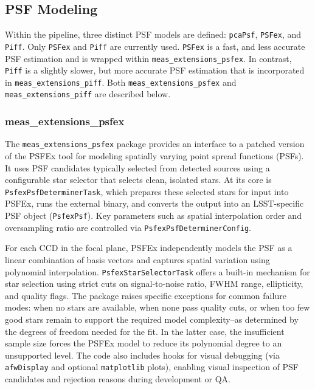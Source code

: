 \subsection{PSF Modeling}

Within the pipeline, three distinct PSF models are defined:  \texttt{pcaPsf}, \texttt{PSFex}, and \texttt{Piff}.
Only \texttt{PSFex} and \texttt{Piff} are currently used.
\texttt{PSFex} is a fast, and less accurate PSF estimation and is wrapped within \texttt{meas\_extensions\_psfex}.
In contrast, \texttt{Piff} is a slightly slower, but more accurate PSF estimation that is incorporated in \texttt{meas\_extensions\_piff}. Both \texttt{meas\_extensions\_psfex} and \texttt{meas\_extensions\_piff} are described below.

\subsubsection{meas\_extensions\_psfex}\label{sec:meas_extensions_psfex}

The \texttt{meas\_extensions\_psfex} package provides an interface to a patched version of the PSFEx tool \citep{2011ASPC..442..435B} for modeling spatially varying point spread functions (PSFs).
It uses PSF candidates typically selected from detected sources using a configurable star selector that selects clean, isolated stars.
At its core is \texttt{PsfexPsfDeterminerTask}, which prepares these selected stars for input into PSFEx, runs the external binary, and converts the output into an LSST-specific PSF object (\texttt{PsfexPsf}).
Key parameters such as spatial interpolation order and oversampling ratio are controlled via \texttt{PsfexPsfDeterminerConfig}.

For each CCD in the focal plane, PSFEx independently models the PSF as a linear combination of basis vectors and captures spatial variation using polynomial interpolation.
\texttt{PsfexStarSelectorTask} offers a built-in mechanism for star selection using strict cuts on signal-to-noise ratio, FWHM range, ellipticity, and quality flags.
The package raises specific exceptions for common failure modes: when no stars are available, when none pass quality cuts, or when too few good stars remain to support the required model complexity--as determined by the degrees of freedom needed for the fit.
In the latter case, the insufficient sample size forces the PSFEx model to reduce its polynomial degree to an unsupported level.
The code also includes hooks for visual debugging (via \texttt{afwDisplay} and optional \texttt{matplotlib} plots), enabling visual inspection of PSF candidates and rejection reasons during development or QA.

